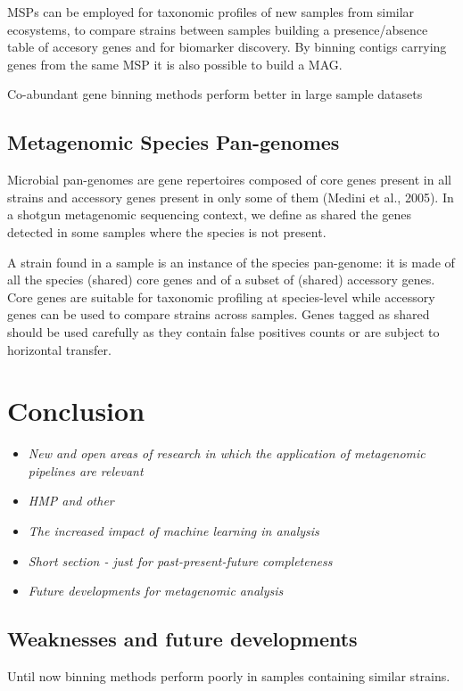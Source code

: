 \documentclass{article}
\begin{document}
MSPs can be employed for taxonomic profiles of new samples from similar ecosystems, to compare strains between samples building a presence/absence table of accesory genes and for biomarker discovery. By binning contigs carrying genes from the same MSP it is also possible to build a MAG.

Co-abundant gene binning methods perform better in large sample datasets

\subsection{Metagenomic Species Pan-genomes}
Microbial pan-genomes are gene repertoires composed of core genes present in all strains and accessory genes present in only some of them (Medini et al., 2005). In a shotgun metagenomic sequencing context, we define as shared the genes detected in some samples where the species is not present.

A strain found in a sample is an instance of the species pan-genome: it is made of all the species (shared) core genes and of a subset of (shared) accessory genes. Core genes are suitable for taxonomic profiling at species-level while accessory genes can be used to compare strains across samples. Genes tagged as shared should be used carefully as they contain false positives counts or are subject to horizontal transfer.
 


	\section{Conclusion}
\begin{itemize}
	\item \emph{New and open areas of research in which the application of metagenomic pipelines are relevant}
	\item \emph{HMP and other }
	\item \emph{The increased impact of machine learning in analysis}
	\item \emph{Short section - just for past-present-future completeness}
	\item \emph{Future developments for metagenomic analysis}
\end{itemize}

\subsection{Weaknesses and future developments}
Until now binning methods perform poorly in samples containing similar strains.
\end{document}
